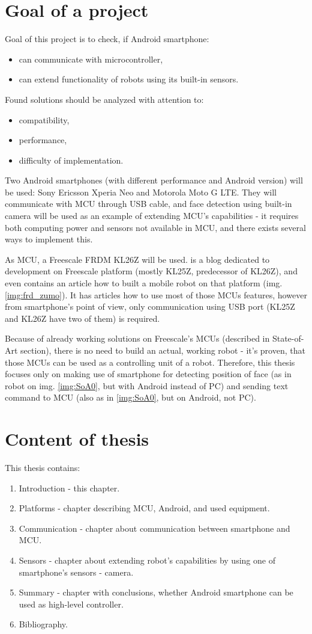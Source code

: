 \documentclass[]{mgr} %
\begin{document}
\section{Goal of a project}
Goal of this project is to check, if Android smartphone:
\begin{itemize}
  \item can communicate with microcontroller,
  \item can extend functionality of robots using its built-in sensors.
\end{itemize}
Found solutions should be analyzed with attention to:
\begin{itemize}
  \item compatibility,
  \item performance,
  \item difficulty of implementation.
\end{itemize}
Two Android smartphones (with different performance and Android version) will be
used: Sony Ericsson Xperia Neo and Motorola Moto G LTE. They will communicate
with MCU through USB cable, and face detection using built-in camera will be
used as an example of extending MCU's capabilities - it requires both computing
power and sensors not available in MCU, and there exists several ways to
implement this.

As MCU, a Freescale FRDM KL26Z will be used. \cite{mcu_on_eclipse} is a blog
dedicated to development on Freescale platform (mostly KL25Z, predecessor of
KL26Z), and even contains an article how to built a mobile robot on that
platform (img. \ref{img:frd_zumo}). It has articles how to use most of
those MCUs features, however from smartphone's point of view, only communication
using USB port (KL25Z and KL26Z have two of them) is required.

Because of already working solutions on Freescale's MCUs (described in
State-of-Art section), there is no need to build an actual, working robot - it's
proven, that those MCUs can be used as a controlling unit of a robot. Therefore,
this thesis focuses only on making use of smartphone for detecting position of
face (as in robot on img. \ref{img:SoA0}, but with Android instead of PC) and
sending text command to MCU (also as in \ref{img:SoA0}, but on Android, not PC).

\section{Content of thesis}
This thesis contains:
\begin{enumerate}
  \item Introduction - this chapter.
  \item Platforms - chapter describing MCU, Android, and used equipment.
  \item Communication - chapter about communication between smartphone and MCU.
  \item Sensors - chapter about extending robot's capabilities by using one of
  smartphone's sensors - camera.
  \item Summary - chapter with conclusions, whether Android smartphone can be
  used as high-level controller.
  \item Bibliography.
\end{enumerate}
\end{document}
